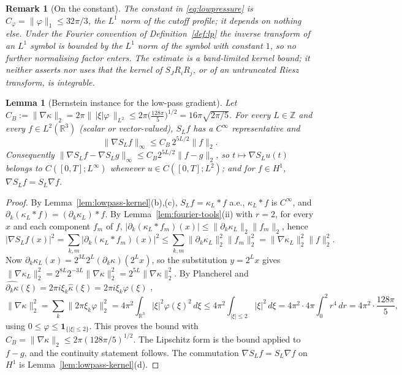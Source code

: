 \documentclass[11pt]{article}
\newtheorem{remark}[theorem]{Remark}
\newtheorem{lemma}[theorem]{Lemma}
\theoremstyle{definition}
\theoremstyle{plain}
\newcommand{\R}{\mathbb R}
\newcommand{\norm}[1]{\lVert #1\rVert}
\begin{document}
\begin{remark}[On the constant]\label{rem:lowpressure-constant}
The constant in \eqref{eq:lowpressure} is $C_\varphi=\norm\varphi_1\le32\pi/3$,
the $L^1$ norm of the cutoff profile; it depends on nothing else.  Under the
Fourier convention of Definition~\ref{def:lp} the inverse transform of an
$L^1$ symbol is bounded by the $L^1$ norm of the symbol with constant $1$,
so no further normalising factor enters.  The estimate is a band-limited
kernel bound; it neither asserts nor uses that the kernel of
$S_JR_iR_j$, or of an untruncated Riesz transform, is integrable.
\end{remark}

\begin{lemma}[Bernstein instance for the low-pass gradient]\label{lem:bernstein}
Let $C_B:=\norm{\nabla\kappa}_2=2\pi\norm{\,|\xi|\varphi\,}_{L^2}
\le2\pi\bigl(\tfrac{128\pi}{5}\bigr)^{1/2}=16\pi\sqrt{2\pi/5}$.
For every $L\in\mathbb Z$ and every $f\in L^2(\R^3)$ (scalar or vector-valued),
$S_Lf$ has a $C^\infty$ representative and
\[
 \norm{\nabla S_Lf}_\infty\le C_B\,2^{5L/2}\norm f_2 .
\]
Consequently $\norm{\nabla S_Lf-\nabla S_Lg}_\infty\le C_B2^{5L/2}\norm{f-g}_2$,
so $t\mapsto\nabla S_Lu(t)$ belongs to $C([0,T];L^\infty)$ whenever
$u\in C([0,T];L^2)$; and for $f\in H^1$, $\nabla S_Lf=S_L\nabla f$.
\end{lemma}

\begin{proof}
By Lemma~\ref{lem:lowpass-kernel}(b),(c), $S_Lf=\kappa_L*f$ a.e., $\kappa_L*f$
is $C^\infty$, and $\partial_k(\kappa_L*f)=(\partial_k\kappa_L)*f$.  By
Lemma~\ref{lem:fourier-tools}(ii) with $r=2$, for every $x$ and each
component $f_m$ of $f$,
$|\partial_k(\kappa_L*f_m)(x)|\le\norm{\partial_k\kappa_L}_2\norm{f_m}_2$, hence
\[
 |\nabla S_Lf(x)|^2=\sum_{k,m}|\partial_k(\kappa_L*f_m)(x)|^2
 \le\sum_{k,m}\norm{\partial_k\kappa_L}_2^2\norm{f_m}_2^2
 =\norm{\nabla\kappa_L}_2^2\norm f_2^2 .
\]
Now $\partial_k\kappa_L(x)=2^{3L}2^L(\partial_k\kappa)(2^Lx)$, so the
substitution $y=2^Lx$ gives
$\norm{\nabla\kappa_L}_2^2=2^{8L}2^{-3L}\norm{\nabla\kappa}_2^2=2^{5L}\norm{\nabla\kappa}_2^2$.
By Plancherel and $\widehat{\partial_k\kappa}(\xi)=2\pi i\xi_k\hat\kappa(\xi)
=2\pi i\xi_k\varphi(\xi)$ \cite[Prop.~2.2.11(9)]{Grafakos2014},
\[
 \norm{\nabla\kappa}_2^2=\sum_k\norm{2\pi\xi_k\varphi}_2^2
 =4\pi^2\int_{\R^3}|\xi|^2\varphi(\xi)^2\,d\xi
 \le4\pi^2\int_{|\xi|\le2}|\xi|^2\,d\xi
 =4\pi^2\cdot4\pi\int_0^2r^4\,dr=4\pi^2\cdot\frac{128\pi}{5},
\]
using $0\le\varphi\le\mathbf 1_{\{|\xi|\le2\}}$.  This proves the bound with
$C_B=\norm{\nabla\kappa}_2\le2\pi(128\pi/5)^{1/2}$.  The Lipschitz form is
the bound applied to $f-g$, and the continuity statement follows.  The
commutation $\nabla S_Lf=S_L\nabla f$ on $H^1$ is
Lemma~\ref{lem:lowpass-kernel}(d).
\end{proof}
\end{document}
